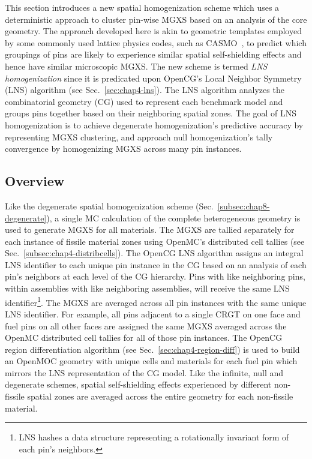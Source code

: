 This section introduces a new spatial homogenization scheme which uses a deterministic approach to cluster pin-wise \ac{MGXS} based on an analysis of the core geometry. The approach developed here is akin to geometric templates employed by some commonly used lattice physics codes, such as CASMO~\cite{rhodes2006casmo}, to predict which groupings of pins are likely to experience similar spatial self-shielding effects and hence have similar microscopic \ac{MGXS}. The new scheme is termed \textit{\ac{LNS} homogenization} since it is predicated upon OpenCG's Local Neighbor Symmetry (LNS) algorithm (see Sec.~\ref{sec:chap4-lns}). The \ac{LNS} algorithm analyzes the combinatorial geometry (CG) used to represent each benchmark model and groups pins together based on their neighboring spatial zones. The goal of \ac{LNS} homogenization is to achieve degenerate homogenization's predictive accuracy by representing \ac{MGXS} clustering, and approach null homogenization's tally convergence by homogenizing \ac{MGXS} across many pin instances.

\subsection{Overview}
\label{subsec:chap9-lns-overview}

Like the degenerate spatial homogenization scheme (Sec.~\ref{subsec:chap8-degenerate}), a single \ac{MC} calculation of the complete heterogeneous geometry is used to generate \ac{MGXS} for all materials. The \ac{MGXS} are tallied separately for each instance of fissile material zones using OpenMC's distributed cell tallies (see Sec.~\ref{subsec:chap4-distribcells}). The OpenCG \ac{LNS} algorithm assigns an integral \ac{LNS} identifier to each unique pin instance in the \ac{CG} based on an analysis of each pin's neighbors at each level of the \ac{CG} hierarchy. Pins with like neighboring pins, within assemblies with like neighboring assemblies, will receive the same \ac{LNS} identifier\footnote{\ac{LNS} hashes a data structure representing a rotationally invariant form of each pin's neighbors.}. The \ac{MGXS} are averaged across all pin instances with the same unique \ac{LNS} identifier. For example, all pins adjacent to a single \ac{CRGT} on one face and fuel pins on all other faces are assigned the same \ac{MGXS} averaged across the OpenMC distributed cell tallies for all of those pin instances. The OpenCG region differentiation algorithm (see Sec.~\ref{sec:chap4-region-diff}) is used to build an OpenMOC geometry with unique cells and materials for each fuel pin which mirrors the \ac{LNS} representation of the \ac{CG} model. Like the infinite, null and degenerate schemes, spatial self-shielding effects experienced by different non-fissile spatial zones are averaged across the entire geometry for each non-fissile material.

